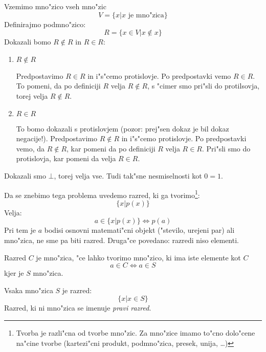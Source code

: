 Vzemimo mno"zico vseh mno"zic
\begin{equation*}
V = \{x | \text{$x$ je mno"zica}\}
\end{equation*}
Definirajmo podmno"zico:
\begin{equation*}
R  = \{x \in V | x \notin x\}
\end{equation*}
Dokazali bomo $R \notin R$ in $R \in R$:
\begin{enumerate}[1)]
	\item $R \notin R$
	
	Predpostavimo $R \in R$ in i"s"cemo protislovje. Po predpostavki vemo $R \in R$. To pomeni, da po definiciji $R$ velja $R \notin R$, s "cimer smo pri"sli do protilsovja, torej velja $R \notin R$.
	
	\item $R \in R$
	
	To bomo dokazali s protislovjem (pozor: prej"sen dokaz je bil dokaz negacije!). Predpostavimo $R \notin R$ in i"s"cemo protislovje. Po predpostavki vemo, da $R \notin R$, kar pomeni da po definiciji $R$ velja $R \in R$. Pri"sli smo do protislovja, kar pomeni da velja $R \in R$.
\end{enumerate}
Dokazali smo $\bot$, torej velja vse. Tudi tak"sne nesmiselnosti kot $0 = 1$.

Da se znebimo tega problema uvedemo razred, ki ga tvorimo\footnote{Tvorba je razli"cna od tvorbe mno"zic. Za mno"zice imamo to"cno dolo"cene na"cine tvorbe (kartezi"cni produkt, podmno"zica, presek, unija, \dots)}:
\begin{equation*}
\{x | p(x)\}
\end{equation*}
Velja:
\begin{equation*}
a \in \{x | p(x)\} \iff p(a)
\end{equation*}
Pri tem je $a$ bodisi osnovni matemati"cni objekt ("stevilo, urejeni par) ali mno"zica, ne sme pa biti razred. Druga"ce povedano: razredi niso elementi.

Razred $C$ je mno"zica, "ce lahko tvorimo mno"zico, ki ima iste elemente kot $C$
\begin{equation*}
a \in C \iff a \in S
\end{equation*}
kjer je $S$ mno"zica.

Vsaka mno"zica $S$ je razred:
\begin{equation*}
\{x | x \in S\}
\end{equation*}
Razred, ki ni mno"zica se imenuje \emph{pravi razred}.

